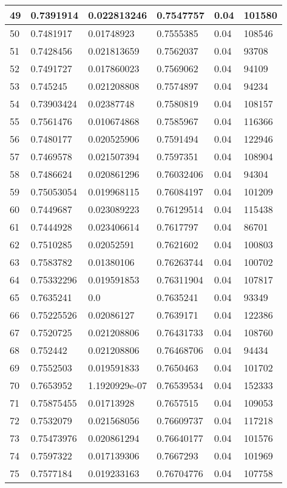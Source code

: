 \begin{longtable}{|l|l|l|l|l|l|}
49 & 0.7391914 & 0.022813246 & 0.7547757 & 0.04 & 101580 \\ \hline 
50 & 0.7481917 & 0.01748923 & 0.7555385 & 0.04 & 108546 \\ \hline 
51 & 0.7428456 & 0.021813659 & 0.7562037 & 0.04 & 93708 \\ \hline 
52 & 0.7491727 & 0.017860023 & 0.7569062 & 0.04 & 94109 \\ \hline 
53 & 0.745245 & 0.021208808 & 0.7574897 & 0.04 & 94234 \\ \hline 
54 & 0.73903424 & 0.02387748 & 0.7580819 & 0.04 & 108157 \\ \hline 
55 & 0.7561476 & 0.010674868 & 0.7585967 & 0.04 & 116366 \\ \hline 
56 & 0.7480177 & 0.020525906 & 0.7591494 & 0.04 & 122946 \\ \hline 
57 & 0.7469578 & 0.021507394 & 0.7597351 & 0.04 & 108904 \\ \hline 
58 & 0.7486624 & 0.020861296 & 0.76032406 & 0.04 & 94304 \\ \hline 
59 & 0.75053054 & 0.019968115 & 0.76084197 & 0.04 & 101209 \\ \hline 
60 & 0.7449687 & 0.023089223 & 0.76129514 & 0.04 & 115438 \\ \hline 
61 & 0.7444928 & 0.023406614 & 0.7617797 & 0.04 & 86701 \\ \hline 
62 & 0.7510285 & 0.02052591 & 0.7621602 & 0.04 & 100803 \\ \hline 
63 & 0.7583782 & 0.01380106 & 0.76263744 & 0.04 & 100702 \\ \hline 
64 & 0.75332296 & 0.019591853 & 0.76311904 & 0.04 & 107817 \\ \hline 
65 & 0.7635241 & 0.0 & 0.7635241 & 0.04 & 93349 \\ \hline 
66 & 0.75225526 & 0.02086127 & 0.7639171 & 0.04 & 122386 \\ \hline 
67 & 0.7520725 & 0.021208806 & 0.76431733 & 0.04 & 108760 \\ \hline 
68 & 0.752442 & 0.021208806 & 0.76468706 & 0.04 & 94434 \\ \hline 
69 & 0.7552503 & 0.019591833 & 0.7650463 & 0.04 & 101702 \\ \hline 
70 & 0.7653952 & 1.1920929e-07 & 0.76539534 & 0.04 & 152333 \\ \hline 
71 & 0.75875455 & 0.01713928 & 0.7657515 & 0.04 & 109053 \\ \hline 
72 & 0.7532079 & 0.021568056 & 0.76609737 & 0.04 & 117218 \\ \hline 
73 & 0.75473976 & 0.020861294 & 0.76640177 & 0.04 & 101576 \\ \hline 
74 & 0.7597322 & 0.017139306 & 0.7667293 & 0.04 & 101969 \\ \hline 
75 & 0.7577184 & 0.019233163 & 0.76704776 & 0.04 & 107758 \\ \hline 
\end{longtable}